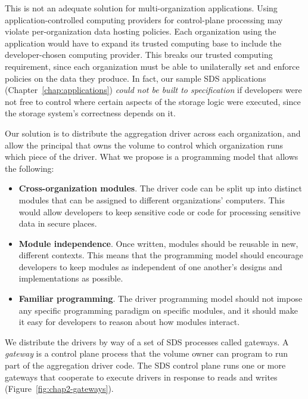 This is not an adequate solution for multi-organization applications.
Using application-controlled computing providers for control-plane processing
may violate per-organization data hosting policies.  Each organization using the application
would have to expand its trusted computing base to include the developer-chosen
computing provider.  This breaks our trusted computing requirement, since each
organization must be able to unilaterally set and enforce policies on the data
they produce.  In fact, our sample SDS applications
(Chapter~\ref{chap:applications}) \emph{could not be built to specification} if
developers were not free to control where certain aspects of the storage logic
were executed, since the storage system's correctness depends on it.

Our solution is to distribute the aggregation driver across each organization,
and allow the principal that owns the volume to control which organization runs
which piece of the driver.
What we propose is a programming model that allows the following:

\begin{itemize}
   \item \textbf{Cross-organization modules}.  The driver code
      can be split up into distinct modules that can be
      assigned to different organizations' computers.  This would allow
      developers to keep sensitive code or code for processing sensitive data
      in secure places.
   \item \textbf{Module independence}.  Once written, modules should be reusable in 
      new, different contexts.  This means that the programming model should
      encourage developers to keep modules as independent of one another's
      designs and implementations as possible.
   \item \textbf{Familiar programming}.  The driver programming model
      should not impose any specific programming paradigm on specific modules,
      and it should make it easy for developers to reason about how modules
      interact.
\end{itemize}

We distribute the drivers by way of a set of SDS processes called gateways.
A \emph{gateway} is a control plane process that the
volume owner can program to run part of the aggregation driver code.  The SDS control plane
runs one or more gateways that cooperate to execute drivers in response
to reads and writes (Figure~\ref{fig:chap2-gateways}).

